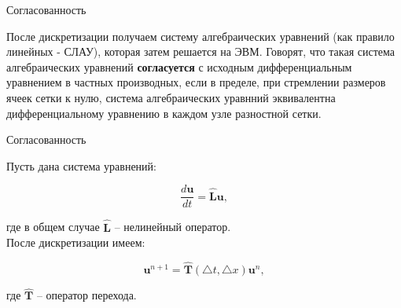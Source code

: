 \documentclass[10pt,xcolor=pst,aspectratio=169]{beamer}
\begin{document}
%
%
%

\begin{frame}{Согласованность}

	\transdissolve[duration=0.1]
	\justifying
	\large

	После дискретизации получаем систему алгебраических уравнений (как правило линейных - СЛАУ), которая затем решается на ЭВМ. Говорят, что такая система алгебраических уравнений \textbf{согласуется} с исходным дифференциальным уравнением в частных производных, если в пределе, при стремлении размеров ячеек сетки к нулю, система алгебраических уравнний эквивалентна дифференциальному уравнению в каждом  узле разностной сетки.

\end{frame}

\begin{frame}{Согласованность}

	\transdissolve[duration=0.1]
	\justifying
	\large

	Пусть дана система уравнений:

	\[
		\frac{d \textbf{u}}{d t} = \hat{\textbf{L}} \textbf{u},
	\]
	
	где в общем случае $\hat{\textbf{L}}$ -- нелинейный оператор.\\

	После дискретизации имеем:

	\[
		\textbf{u}^{n+1} = \hat{\textbf{T}} (\triangle t, \triangle x) \textbf{u}^{n},
	\]

	где $\hat{\textbf{T}}$ -- оператор перехода.

\end{frame}
\end{document}
